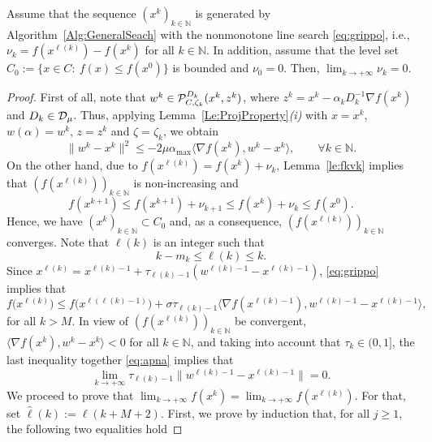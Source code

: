 \begin{proposition} \label{pr;gripponuo}
	Assume that the sequence  $(x^k)_{k\in\mathbb{N}}$ is generated by Algorithm~\ref{Alg:GeneralSeach} with the  nonmonotone line  search \eqref{eq:grippo}, i.e.,  $\nu_{k}= f(x^{\ell(k)})-f(x^k)$ for all  $k \in \mathbb{N}$. In addition,  assume that the level set $C_{0}:=\{ x\in C: ~ f(x)\leq f(x^0) \}$ is bounded and $\nu_0= 0$.  Then, $\lim_{k\to +\infty} \nu_{k} = 0$.
\end{proposition}
\begin{proof}
	First of all, note that     $w^k \in   {\cal P}_{C,\zeta_k}^{D_k}(x^{k}, z^k)$,  where $z^k = x^{k}-\alpha_k D^{-1} _k\nabla f(x^{k})$ and $D_k\in {\cal D}_{\mu}$. Thus,  applying Lemma~\ref{Le:ProjProperty}{\it (i)}  with $x=x^k$, $w(\alpha) = w^k$, $z = z^k$ and $\zeta= \zeta_k$, we obtain
	\begin{equation}\label{eq:apna}
		\|w^k-x^k\|^2\leq -2\mu \alpha_{\max}\langle \nabla f(x^{k}), w^k-x^{k}\rangle, \qquad \forall k \in \mathbb{N}.
	\end{equation}
	On the other hand, due to   $f(x^{\ell(k)})= f(x^k)+ \nu_{k}$,  Lemma~\ref{le:fkvk} implies that    $(f(x^{\ell(k)}))_{k\in\mathbb{N}}$ is    non-increasing and 
	$$ 
	  f(x^{k+1})\leq   f(x^{k+1})+\nu_{k+1}\leq f(x^{k})+\nu_{k}\leq  f(x^{0}).
	$$
	Hence, we have  $(x^k)_{k\in\mathbb{N}}\subset C_{0}$ and, as a consequence,    $(f(x^{\ell(k)}))_{k\in\mathbb{N}}$ converges. Note that $\ell(k)$   is an integer such that
	\begin{equation}\label{eq:lk}
		k-m_k\leq \ell(k)\leq k.
	\end{equation}
	Since $x^{{\ell(k)}}=x^{{\ell(k)}-1}+ \tau_{{\ell(k)}-1} (w^{{\ell(k)}-1} - x^{{\ell(k)} -1})$,  \eqref{eq:grippo}  implies that
	$$
		f\big(x^{\ell(k)}\big)  \leq f\big(x^{\ell({{\ell(k)}-1})}\big)+ \sigma \tau_{{\ell(k)}-1}\big\langle \nabla f(x^{{\ell(k)}-1}), w^{{\ell(k)}-1} - x^{{\ell(k)}-1} \big\rangle,
	$$
	for all $k>M$.  In view of   $(f(x^{\ell(k)}))_{k\in\mathbb{N}}$  be convergent, $\langle \nabla f(x^{k}), w^k - x^{k} \rangle<0$ for all  $k \in \mathbb{N}$, and taking into account that   $\tau_k  \in (0, 1]$,  the last inequality together \eqref{eq:apna} implies that
	\begin{equation}\label{eq:apcss}
		\lim_{k\to +\infty} \tau_{{\ell(k)}-1}\|w^{{\ell(k)}-1}-x^{{\ell(k)}-1}\|=0.
	\end{equation}
	We proceed to  prove that  $\lim_{k\to +\infty} f(x^{k})= \lim_{k\to +\infty} f(x^{\ell(k)})$. For that, set ${\hat \ell}(k):=\ell(k+M+2)$. First, we prove by induction that, for all  $j\geq 1$,  the following two equalities  hold

\end{proof}
